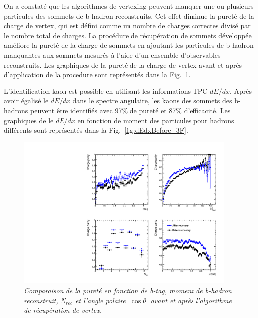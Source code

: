 On a constaté que les algorithmes de vertexing peuvent manquer une ou plusieurs particules des sommets de b-hadron reconstruits. Cet effet diminue la pureté de la charge de vertex, qui est défini comme  un nombre de charges correctes divisé par le nombre total de charges.
La procédure de récupération de sommets développée améliore la pureté de la charge de sommets en ajoutant les particules de b-hadron manquantes aux sommets mesurés à l'aide d'un ensemble d'observables reconstruits. Les graphiques de la pureté de la charge de vertex avant et apr\'es d'application de la procedure sont représentés dans la Fig.~\ref{fig:RecoveryPurityComparison_3F}.

L'identification kaon est possible en utilisant les informations TPC $dE/dx$. Après avoir égalisé le $dE/dx$ dans le spectre angulaire, les kaons des sommets des b-hadrons peuvent être identifiés avec 97\% de pureté et 87\% d'efficacité.
Les graphiques de le $dE/dx$ en fonction de moment des particules pour hadrons différents sont représentés dans  la Fig.~\ref{fig:dEdxBefore_3F}.

\begin{figure}
	{\centering
		\includegraphics[width=0.95\textwidth]{ILD/plots/recovery-purity-comparison.pdf}
		\caption{\sl Comparaison de la pureté en fonction de b-tag, moment de b-hadron reconstruit, $N_ {rec}$ et l'angle polaire $|\cos\theta|$ avant et après l'algorithme de récupération de vertex. 
		}
		\label{fig:RecoveryPurityComparison_3F}
	}
\end{figure}

